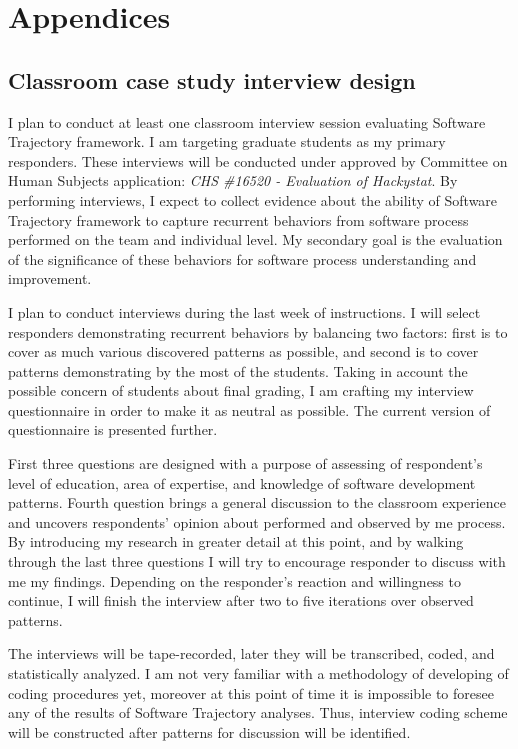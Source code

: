 \chapter{Appendices} \label{appendix}

\section{Classroom case study interview design} \label{survey}
I plan to conduct at least one classroom interview session evaluating Software Trajectory framework. I am targeting graduate students as my primary responders. These interviews will be conducted under approved by Committee on Human Subjects application: \textit{CHS \#16520 - Evaluation of Hackystat}. By performing interviews, I expect to collect evidence about the ability of Software Trajectory framework to capture recurrent behaviors from software process performed on the team and individual level. My secondary goal is the evaluation of the significance of these behaviors for software process understanding and improvement. 

I plan to conduct interviews during the last week of instructions. I will select responders demonstrating recurrent behaviors by balancing two factors: first is to cover as much various discovered patterns as possible, and second is to cover patterns demonstrating by the most of the students. Taking in account the possible concern of students about final grading, I am crafting my interview questionnaire in order to make it as neutral as possible. The current version of questionnaire is presented further. 

First three questions are designed with a purpose of assessing of respondent's level of education, area of expertise, and knowledge of software development patterns. Fourth question brings a general discussion to the classroom experience and uncovers respondents' opinion about performed and observed by me process. By introducing my research in greater detail at this point, and by walking through the last three questions I will try to encourage responder to discuss with me my findings. Depending on the responder's reaction and willingness to continue, I will finish the interview after two to five iterations over observed patterns.

The interviews will be tape-recorded, later they will be transcribed, coded, and statistically analyzed. I am not very familiar with a methodology of developing of coding procedures yet, moreover at this point of time it is impossible to foresee any of the results of Software Trajectory analyses. Thus, interview coding scheme will be constructed after patterns for discussion will be identified.

